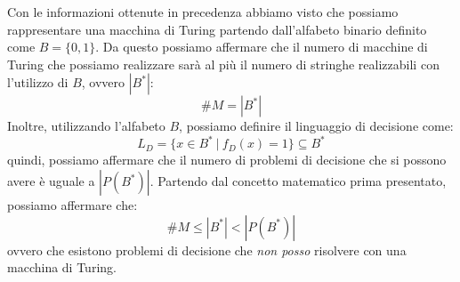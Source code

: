 Con le informazioni ottenute in precedenza abbiamo visto che possiamo rappresentare
una macchina di Turing partendo dall'alfabeto binario definito come $B = \{0, 1\}$.
Da questo possiamo affermare che il numero di macchine di Turing che possiamo realizzare
sarà al più il numero di stringhe realizzabili con l'utilizzo di $B$, ovvero $|B^{\ast}|$:
\begin{equation}
    \# M = |B^{\ast}|
\end{equation}
Inoltre, utilizzando l'alfabeto $B$, possiamo definire il linguaggio di decisione come:
\begin{equation}
    L_D = \{x \in B^{\ast} \ | \ f_D(x) = 1\} \subseteq B^{\ast}
\end{equation}
quindi, possiamo affermare che il numero di problemi di decisione che si possono
avere è uguale a $|P(B^{\ast})|$. Partendo dal concetto matematico prima presentato,
possiamo affermare che:
\begin{equation}
    \# M \leq |B^{\ast}| < |P(B^{\ast})|
\end{equation}
ovvero che esistono problemi di decisione che \textit{non posso} risolvere con
una macchina di Turing.
